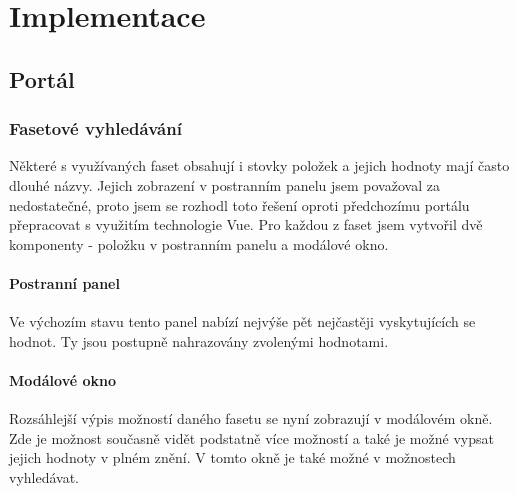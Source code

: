 \chapter{Implementace}

\section{Portál}

\subsection{Fasetové vyhledávání}
Některé s využívaných faset obsahují i stovky položek a jejich hodnoty mají často dlouhé názvy. Jejich zobrazení v postranním panelu jsem považoval za nedostatečné, proto jsem se rozhodl toto řešení oproti předchozímu portálu přepracovat s využitím technologie Vue. Pro každou z faset jsem vytvořil dvě komponenty - položku v postranním panelu a modálové okno.

\subsubsection{Postranní panel}
Ve výchozím stavu tento panel nabízí nejvýše pět nejčastěji vyskytujících se hodnot. Ty jsou postupně nahrazovány zvolenými hodnotami.

\subsubsection{Modálové okno}
Rozsáhlejší výpis možností daného fasetu se nyní zobrazují v modálovém okně. Zde je možnost současně vidět podstatně více možností a také je možné vypsat jejich hodnoty v plném znění. V tomto okně je také možné v možnostech vyhledávat.